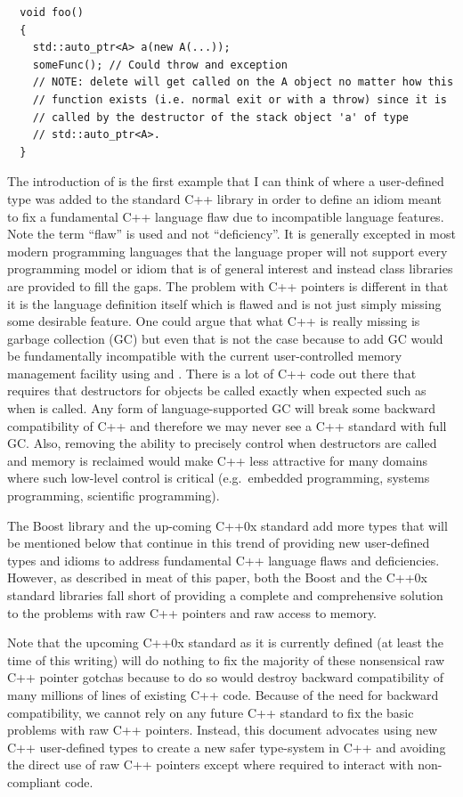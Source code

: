 \documentclass[pdf,ps2pdf,11pt]{SANDreport}
\begin{document}
{\small\begin{verbatim}
  void foo()
  {
    std::auto_ptr<A> a(new A(...));
    someFunc(); // Could throw and exception
    // NOTE: delete will get called on the A object no matter how this
    // function exists (i.e. normal exit or with a throw) since it is
    // called by the destructor of the stack object 'a' of type
    // std::auto_ptr<A>. 
  }
\end{verbatim}}

The introduction of {} is the first example that I
can think of where a user-defined type was added to the standard C++
library in order to define an idiom meant to fix a fundamental C++
language flaw due to incompatible language features.  Note the term
``flaw'' is used and not ``deficiency''.  It is generally excepted in
most modern programming languages that the language proper will not
support every programming model or idiom that is of general interest
and instead class libraries are provided to fill the gaps.  The
problem with C++ pointers is different in that it is the language
definition itself which is flawed and is not just simply missing some
desirable feature.  One could argue that what C++ is really missing is
garbage collection (GC) but even that is not the case because to add
GC would be fundamentally incompatible with the current
user-controlled memory management facility using {} and
{}.  There is a lot of C++ code out there that requires
that destructors for objects be called exactly when expected such as
when {} is called.  Any form of language-supported GC will
break some backward compatibility of C++ and therefore we may never
see a C++ standard with full GC.  Also, removing the ability to
precisely control when destructors are called and memory is reclaimed
would make C++ less attractive for many domains where such low-level
control is critical (e.g.\ embedded programming, systems programming,
scientific programming).

The Boost library and the up-coming C++0x standard add more types that
will be mentioned below that continue in this trend of providing new
user-defined types and idioms to address fundamental C++ language
flaws and deficiencies.  However, as described in meat of this paper,
both the Boost and the C++0x standard libraries fall short of
providing a complete and comprehensive solution to the problems with
raw C++ pointers and raw access to memory.

Note that the upcoming C++0x standard as it is currently defined (at
least the time of this writing) will do nothing to fix the majority of
these nonsensical raw C++ pointer gotchas because to do so would
destroy backward compatibility of many millions of lines of existing
C++ code.  Because of the need for backward compatibility, we cannot
rely on any future C++ standard to fix the basic problems with raw C++
pointers.  Instead, this document advocates using new C++ user-defined
types to create a new safer type-system in C++ and avoiding the direct
use of raw C++ pointers except where required to interact with
non-compliant code.
\end{document}
